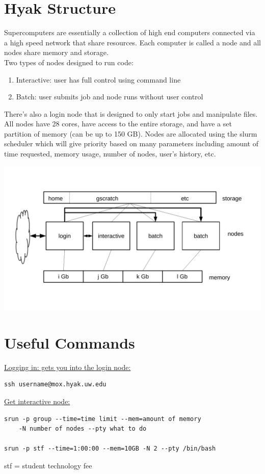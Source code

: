 \documentclass{article}
\begin{document}
\section{Hyak Structure}

Supercomputers are essentially a collection of high end computers connected via a high speed network that share resources. Each computer is called a node and all nodes share memory and storage.\\
Two types of nodes designed to run code:
\begin{enumerate}
\item Interactive: user has full control using command line
\item Batch: user submits job and node runs without user control
\end{enumerate}
There's also a login node that is designed to only start jobs and manipulate files. All nodes have 28 cores, have access to the entire storage, and have a set partition of memory (can be up to 150 GB).
Nodes are allocated using the slurm scheduler which will give priority based on many parameters including amount of time requested, memory usage, number of nodes, user's history, etc.

\includegraphics[width=\textwidth]{hyak.pdf}
\section{Useful Commands}
 
\quad\underline{Logging in: gets you into the login node:}
\begin{lstlisting}
ssh username@mox.hyak.uw.edu
\end{lstlisting}

\underline{Get interactive node:}
\begin{lstlisting}
srun -p group --time=time limit --mem=amount of memory 
	-N number of nodes --pty what to do
	
srun -p stf --time=1:00:00 --mem=10GB -N 2 --pty /bin/bash
\end{lstlisting}
stf = student technology fee\\
\end{document}
